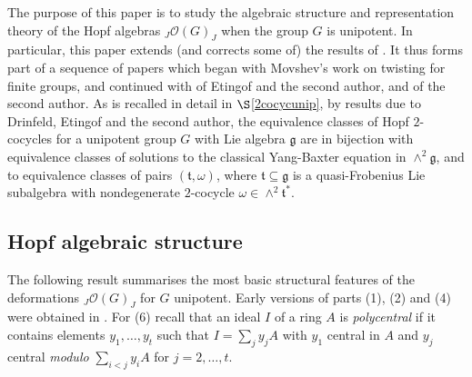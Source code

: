\documentclass{amsart}
\numberwithin{equation}{section}
\theoremstyle{definition}
\begin{document}
The purpose of this paper is to study the algebraic structure and representation theory of the Hopf algebras ${}_J\mathcal{O}(G)_J$ when the group $G$ is unipotent. In particular, this paper extends (and corrects some of) the results of \cite{G2}. It thus forms part of a sequence of papers which began with Movshev's work \cite{Mo} on twisting for finite groups, and continued with  \cite{EG1,EG2,EG3,EG4,EG5,EG6} of Etingof and the second author, and \cite{G0,G1,G2} of the second author. As is recalled in detail in 
$\S$\ref{2cocycunip}, by results due to Drinfeld, Etingof and the second author, the equivalence classes of Hopf $2$-cocycles for a unipotent group $G$ with Lie algebra $\mathfrak{g}$ are in bijection with equivalence classes of solutions to the classical Yang-Baxter equation in $\wedge^2 \mathfrak{g}$, and to equivalence classes of pairs $(\mathfrak{t}, \omega)$, where $\mathfrak{t}\subseteq \mathfrak{g}$ is a quasi-Frobenius Lie subalgebra with nondegenerate $2$-cocycle $\omega\in \wedge^2 \mathfrak{t}^*$.

\subsection{Hopf algebraic structure}\label{subsec1.2} The following result summarises the most basic structural features of the deformations ${}_J\mathcal{O}(G)_J$ for $G$ unipotent. Early versions of parts (1), (2)  and (4) were obtained in \cite{G2}. For (6) recall that an ideal $I$ of a ring $A$ is \emph{polycentral} if it contains elements $y_1, \ldots , y_t$ such that $I = \sum_j y_j A$ with $y_1$ central in $A$ and $y_j$ central \emph{modulo} $\sum_{i < j} y_i A$ for $j = 2, \ldots , t$. 
\end{document}
